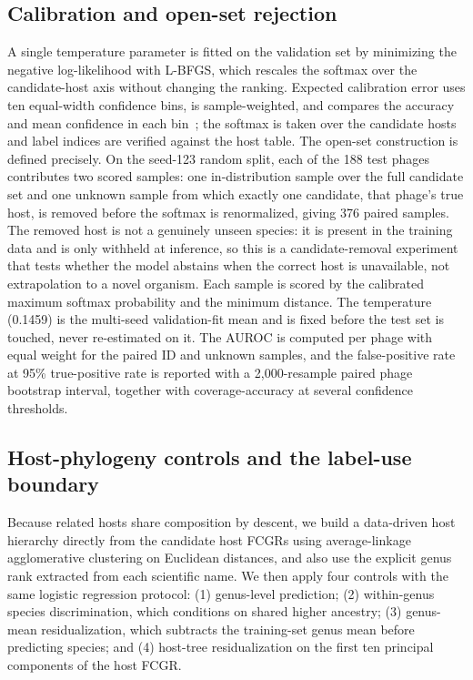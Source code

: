 \documentclass[utf8]{FrontiersinVancouver}
\begin{document}
\subsection{Calibration and open-set rejection}

A single temperature parameter is fitted on the validation set by minimizing the negative log-likelihood with L-BFGS, which rescales the softmax over the candidate-host axis without changing the ranking. Expected calibration error uses ten equal-width confidence bins, is sample-weighted, and compares the accuracy and mean confidence in each bin~\citep{guo2017calibration,naeini2015bayesian}; the softmax is taken over the candidate hosts and label indices are verified against the host table. The open-set construction is defined precisely. On the seed-123 random split, each of the 188 test phages contributes two scored samples: one in-distribution sample over the full candidate set and one unknown sample from which exactly one candidate, that phage's true host, is removed before the softmax is renormalized, giving 376 paired samples. The removed host is not a genuinely unseen species: it is present in the training data and is only withheld at inference, so this is a candidate-removal experiment that tests whether the model abstains when the correct host is unavailable, not extrapolation to a novel organism. Each sample is scored by the calibrated maximum softmax probability and the minimum distance. The temperature (0.1459) is the multi-seed validation-fit mean and is fixed before the test set is touched, never re-estimated on it. The AUROC is computed per phage with equal weight for the paired ID and unknown samples, and the false-positive rate at 95\% true-positive rate is reported with a 2,000-resample paired phage bootstrap interval, together with coverage-accuracy at several confidence thresholds.

\subsection{Host-phylogeny controls and the label-use boundary}

Because related hosts share composition by descent, we build a data-driven host hierarchy directly from the candidate host FCGRs using average-linkage agglomerative clustering on Euclidean distances, and also use the explicit genus rank extracted from each scientific name. We then apply four controls with the same logistic regression protocol: (1) genus-level prediction; (2) within-genus species discrimination, which conditions on shared higher ancestry; (3) genus-mean residualization, which subtracts the training-set genus mean before predicting species; and (4) host-tree residualization on the first ten principal components of the host FCGR.
\end{document}
